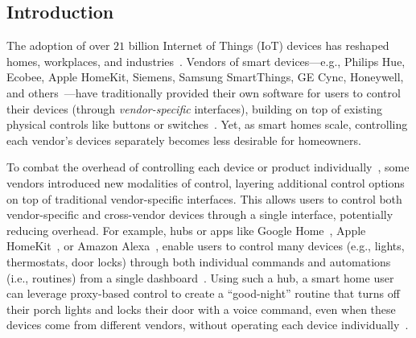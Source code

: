 \subsection{Introduction}
\label{cic:sec:intro}

The adoption of over $21$ billion Internet of Things (IoT) devices has reshaped homes, workplaces, and industries~\cite{iotanalytics2025, memoori2025iot, mehra2020smarthome, statista_smarthome, tripathi2022role}. Vendors of smart devices---e.g., Philips Hue, Ecobee, Apple HomeKit, Siemens, Samsung SmartThings, GE Cync, Honeywell, and others~\cite{ecobee, Philips, GESync, AppleSmartThings, Honeywell, Siemens, SamsungSmartThings}---have traditionally provided their own software for users to control their devices {(through \textit{vendor-specific} interfaces), building on top of existing physical controls like buttons or switches~\cite{kodali2016iot, Khan2022Smart}}. Yet, as smart homes scale, controlling each vendor's devices separately becomes less desirable for homeowners. 

To combat the overhead of controlling each device or product individually~\cite{kaufhold2024we}, some vendors introduced {new modalities of control}, {layering additional control options on top of traditional vendor-specific interfaces}. This allows users to control both vendor-specific and cross-vendor devices through a single interface, potentially reducing overhead. For example, hubs or apps like Google Home~\cite{GoogleHome}, Apple HomeKit~\cite{apple_homekit}, or Amazon Alexa~\cite{Alexa}, enable users to control many devices (e.g., lights, thermostats, door locks) through both individual commands and automations (i.e., routines) from a single dashboard~\cite{routine-early-def, routine1, routine2}. Using such a hub, a smart home user can leverage proxy-based control to create a ``good-night'' routine that turns off their porch lights and locks their door with a voice command, even when these devices come from different vendors, without operating each device individually~\cite{sikder2022s}.

